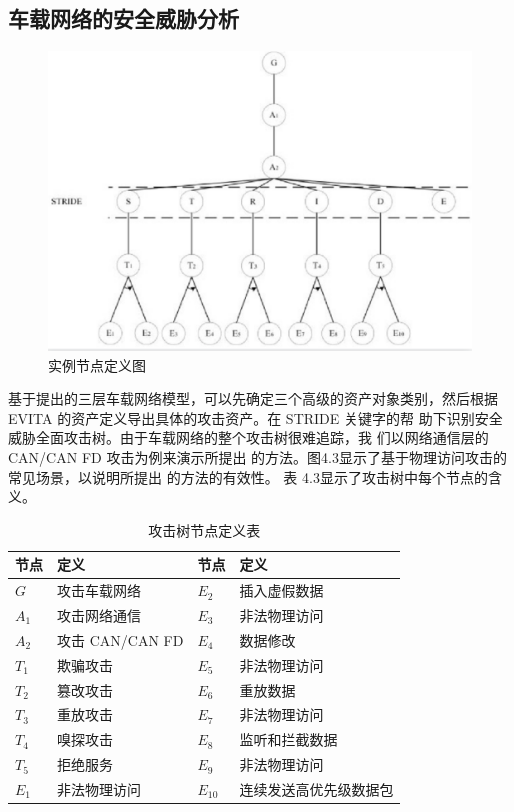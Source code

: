 \subsection{车载网络的安全威胁分析}
\begin{figure}
  \centering
  \includegraphics[scale=0.5]{resources/img/i31.png}
  \caption{实例节点定义图}
\end{figure}
基于提出的三层车载网络模型，可以先确定三个高级的资产对象类别，然后根据 EVITA\cite{dominic2016risk}
的资产定义导出具体的攻击资产。在 STRIDE 关键字的帮
助下识别安全威胁全面攻击树。由于车载网络的整个攻击树很难追踪，我
们以网络通信层的 CAN/CAN FD\cite{reindl2021comparative} \cite{zago2017quantitative} 攻击为例来演示所提出
的方法。图4.3显示了基于物理访问攻击的常见场景，以说明所提出
的方法的有效性。
表 4.3显示了攻击树中每个节点的含
义。
\begin{table}
  \caption{攻击树节点定义表}
\begin{center}
    \begin{tabular}{|l|l|l|l|}
      \hline 节点 & 定义 & 节点 & 定义 \\
      \hline $G$ & 攻击车载网络 & $E_2$ & 插入虚假数据 \\
      \hline $A_1$ & 攻击网络通信 & $E_3$ & 非法物理访问 \\
      \hline $A_2$ & 攻击 CAN/CAN FD & $E_4$ &数据修改 \\
      \hline $T_1$ & 欺骗攻击 & $E_5$ & 非法物理访问 \\
      \hline $T_2$ & 篡改攻击 & $E_6$ & 重放数据 \\
      \hline $T_3$ & 重放攻击 & $E_7$ & 非法物理访问 \\
      \hline $T_4$ & 嗅探攻击 & $E_8$ & 监听和拦截数据 \\
      \hline $T_5$ & 拒绝服务 & $E_9$ & 非法物理访问 \\
      \hline $E_1$ & 非法物理访问 & $E_{10}$ & 连续发送高优先级数据包 \\\hline
      \end{tabular}
  \end{center}
\end{table}
